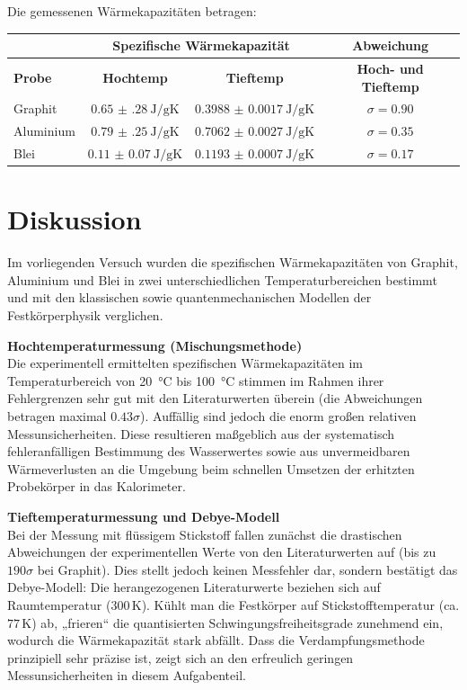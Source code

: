 \documentclass[12pt,a4paper,titlepage]{scrartcl}
\numberwithin{equation}{section}
\numberwithin{table}{section}
\numberwithin{figure}{section}
\begin{document}
\begin{resultbox}[Ergebnis]
    Die gemessenen Wärmekapazitäten betragen:
    \begin{center}
        \begin{tabular}{lccc}
            \toprule
            & \multicolumn{2}{c}{\textbf{Spezifische Wärmekapazität}} & \textbf{Abweichung} \\
            \midrule
            \textbf{Probe} & \textbf{Hochtemp} & \textbf{Tieftemp} & \textbf{Hoch- und Tieftemp} \\
            \midrule
            Graphit & $\qty{0.65(28)}{\joule\per\gram\kelvin}$ & $\qty{0.3988(17)}{\joule\per\gram\kelvin}$ & $\sigma = 0.90$ \\
            Aluminium & $\qty{0.79(25)}{\joule\per\gram\kelvin}$ & $\qty{0.7062(27)}{\joule\per\gram\kelvin}$ & $\sigma = 0.35$ \\
            Blei & $\qty{0.11(7)}{\joule\per\gram\kelvin}$ & $\qty{0.1193(7)}{\joule\per\gram\kelvin}$ & $\sigma = 0.17$ \\
            \bottomrule
        \end{tabular}
    \end{center}
\end{resultbox}


\section{Diskussion}
Im vorliegenden Versuch wurden die spezifischen Wärmekapazitäten von Graphit, Aluminium und Blei in zwei unterschiedlichen Temperaturbereichen bestimmt und mit den klassischen sowie quantenmechanischen Modellen der Festkörperphysik verglichen.

\textbf{Hochtemperaturmessung (Mischungsmethode)} \\
Die experimentell ermittelten spezifischen Wärmekapazitäten im Temperaturbereich von \qty{20}{\degreeCelsius} bis \qty{100}{\degreeCelsius} stimmen im Rahmen ihrer Fehlergrenzen sehr gut mit den Literaturwerten überein (die Abweichungen betragen maximal $\num{0.43}\sigma$). Auffällig sind jedoch die enorm großen relativen Messunsicherheiten. Diese  resultieren maßgeblich aus der systematisch fehleranfälligen Bestimmung des Wasserwertes sowie aus unvermeidbaren Wärmeverlusten an die Umgebung beim schnellen Umsetzen der erhitzten Probekörper in das Kalorimeter. 


\textbf{Tieftemperaturmessung und Debye-Modell} \\
Bei der Messung mit flüssigem Stickstoff fallen zunächst die drastischen Abweichungen der experimentellen Werte von den Literaturwerten auf (bis zu $190\sigma$ bei Graphit). Dies stellt jedoch keinen Messfehler dar, sondern bestätigt das Debye-Modell: Die herangezogenen Literaturwerte beziehen sich auf Raumtemperatur ($300\,\mathrm{K}$). Kühlt man die Festkörper auf Stickstofftemperatur (ca. $77\,\mathrm{K}$) ab, „frieren“ die quantisierten Schwingungsfreiheitsgrade zunehmend ein, wodurch die Wärmekapazität stark abfällt. Dass die Verdampfungsmethode prinzipiell sehr präzise ist, zeigt sich an den erfreulich geringen Messunsicherheiten in diesem Aufgabenteil.
\end{document}
